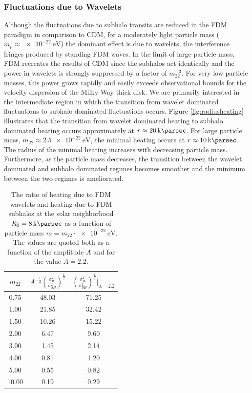 \documentclass[usenatbib]{mnras}
\begin{document}
\subsubsection{Fluctuations due to Wavelets}

Although the fluctuations due to subhalo transits are reduced in the FDM paradigm in comparison to CDM, for a moderately light particle mass ($m_p \approx \SI{e-22}{\electronvolt}$) the dominant effect is due to wavelets, the interference fringes produced by standing FDM waves. In the limit of large particle mass, FDM recreates the results of CDM since the subhalos act identically and the power in wavelets is strongly suppressed by a factor of $m_{22}^{-3}$. For very low particle masses, this power grows rapidly and easily exceeds observational bounds for the velocity dispersion of the Milky Way thick disk. We are primarily interested in the intermediate region in which the transition from wavelet dominated fluctuations to subhalo dominated fluctuations occurs. Figure \ref{fig:radiusheating} illustrates that the transition from wavelet dominated heating to subhalo dominated heating occurs approximately at $r \approx \SI{20}{\kilo \parsec}$. For large particle mass, $m_{22} \approx \SI{2.5e-22}{\electronvolt}$, the minimal heating occurs at $r \approx \SI{10}{\kilo \parsec}$. The radius of the minimal heating increases with decreasing particle mass. Furthermore, as the particle mass decreases, the transition between the wavelet dominated and subhalo dominated regimes becomes smoother and the minimum between the two regimes is ameliorated.   


\begin{table} \label{FDM_ratio}
\begin{center}
 \begin{tabular}{||c c c||} 
 \hline
 $m_{22}$ & $A^{-\tfrac{1}{2}} \left( \frac{\sigma_{W}^2}{\sigma_{SH}^2} \right)^{\tfrac{1}{2}}$ & $ \left( \frac{\sigma_{W}^2}{\sigma_{SH}^2} \right)^{\tfrac{1}{2}} \bigg|_{A = 2.2}$ \\ [2.5ex] 
 \hline\hline
 0.75 & 48.03 & 71.25 \\ 
 \hline
 1.00 & 21.85 & 32.42 \\
 \hline
 1.50 & 10.26 & 15.22 \\
 \hline
 2.00 & 6.47 & 9.60 \\
 \hline
 3.00 & 1.45 & 2.14 \\
 \hline
 4.00 & 0.81 & 1.20 \\
 \hline
 5.00 & 0.55 & 0.82 \\
 \hline
 10.00 & 0.19 & 0.29 \\ [1ex] 
 \hline
\end{tabular}
\end{center}
\caption{The ratio of heating due to FDM wavelets and heating due to FDM subhalos at the solar neighborhood $R_0 = \SI{8}{\kilo\parsec}$ as a function of particle mass $m = m_{22} \cdot \SI{e-22}{\electronvolt}$. The values are quoted both as a function of the amplitude $A$ and for the value $A = 2.2$. }
\end{table}
\end{document}
